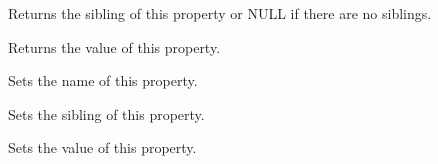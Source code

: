 
Returns the sibling of this property or NULL if there are no siblings.

\label{wxxmlattributegetvalue}


Returns the value of this property.

\label{wxxmlattributesetname}


Sets the name of this property.

\label{wxxmlattributesetnext}


Sets the sibling of this property.

\label{wxxmlattributesetvalue}


Sets the value of this property.

